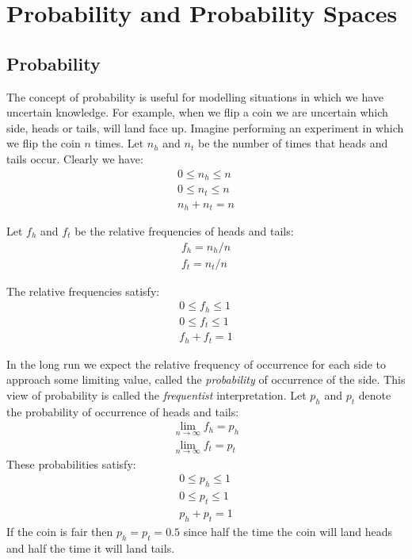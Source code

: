 \documentclass{article}
\begin{document}
\section{Probability and Probability Spaces}

\subsection{Probability}

The concept of probability is useful for modelling situations in which we have uncertain knowledge.
For example, when we flip a coin we are uncertain which side, heads or tails, will land face up.
Imagine performing an experiment in which we flip the coin $n$ times.
Let $n_h$ and $n_t$ be the number of times that heads and tails occur.
Clearly we have:
\begin{eqnarray}
	0 \le n_h \le n \\
	0 \le n_t \le n \\
	n_h + n_t = n
\end{eqnarray}

Let $f_h$ and $f_t$ be the relative frequencies of heads and tails:
\begin{eqnarray}
	f_h = n_h / n \\
	f_t = n_t / n
\end{eqnarray}

The relative frequencies satisfy:
\begin{eqnarray}
	0 \le f_h \le 1 \\
	0 \le f_t \le 1 \\
	f_h + f_t = 1
\end{eqnarray}

In the long run we expect the relative frequency of occurrence for each side to approach some limiting value, called the {\it probability}
of occurrence of the side.
This view of probability is called the {\it frequentist} interpretation.
Let $p_h$ and $p_t$ denote the probability of occurrence of heads and tails:
\begin{eqnarray}
	\lim_{n \rightarrow \infty} f_h = p_h \\
	\lim_{n \rightarrow \infty} f_t = p_t
\end{eqnarray}
These probabilities satisfy:
\begin{eqnarray}
	0 \le p_h \le 1 \\
	0 \le p_t \le 1 \\
	p_h + p_t = 1
\end{eqnarray}
If the coin is fair then $p_h = p_t = 0.5$ since half the time the coin will land heads and half the time it will land tails. 
\end{document}
